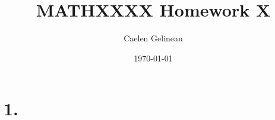 \documentclass[11pt]{article}
\title{MATHXXXX Homework X}
\author{Caelen Gelineau}
\date{\today}
\begin{document}
\maketitle

\section*{1.}
\end{document}
